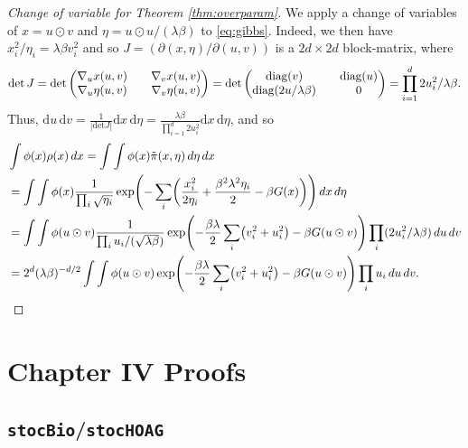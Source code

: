 \documentclass[11pt, twoside]{report}
\begin{document}
\begin{proof}[Change of variable for Theorem \ref{thm:overparam}]
We apply a change of variables of $x = u \odot v$ and $\eta = u \odot u /(\lambda \beta)$ to \eqref{eq:gibbs}. 
Indeed, we then have $x_i^2/\eta_i = \lambda\beta v_i^2$ and so $J = (\partial(x,\eta) / \partial(u,v))$ is a $2d \times 2d$ block-matrix, where
    $$\operatorname{det}J 
    = 
    \operatorname{det}\begin{pmatrix}
     \nabla_u x(u,v) && \nabla_v x(u,v) \\
     \nabla_u \eta(u,v) && \nabla_v \eta(u,v)
    \end{pmatrix} =\operatorname{det}\begin{pmatrix}
     \operatorname{diag}(v) && \operatorname{diag}(u) \\
     \operatorname{diag}(2u/\lambda\beta) && 0
    \end{pmatrix} = \prod_{i=1}^d 2u_i^2/\lambda\beta.$$
Thus, $\mathrm{d}u\,\mathrm{d}v = \frac{1}{|\mathrm{det}J|} \mathrm{d}
    x\,\mathrm{d}\eta = \frac{\lambda\beta}{\prod_{i=1}^d 2u_i^2} \mathrm{d}x\,\mathrm{d}\eta$, and so
\begin{align*}
    &\int \phi(x)\rho(x)\, dx = \int \int \phi(x) \tilde \pi(x,\eta)\,d\eta \,dx\\
    &=\int \int \phi(x) \frac{1}{\prod_{i} \sqrt{\eta_i}} \exp\pa{  -\sum_i \pa{ \frac{x_i^2}{2\eta_i} + \frac{\beta^2\lambda^2\eta_i}{2} -\beta G(x)} } \,dx\,d\eta\\
    &=\int \int \phi(u\odot v) \frac{1}{\prod_{i} u_i/(\sqrt{\lambda \beta})} \exp\pa{  -\frac{\beta\lambda}{2}\sum_i \pa{ v_i^2+u_i^2 } -\beta G(u\odot v) } \prod_i (2u_i^2/\lambda \beta) \,du\, dv\\
    &= 2^d (\lambda\beta)^{-d/2} \int \int \phi(u\odot v)  \exp\pa{  -\frac{\beta\lambda}{2}\sum_i \pa{  v_i^2+u_i^2 } -\beta G(u\odot v) } \prod_i u_i \,du\, dv.
\end{align*}
\end{proof}

\chapter{Chapter IV Proofs}
\label{bilevel_proofs}

\section{\texttt{stocBio}/\texttt{stocHOAG}}
\end{document}
